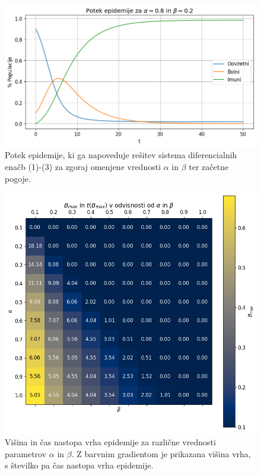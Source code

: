 \documentclass[slovene,11pt,a4paper]{article}
\begin{document}
\begin{figure}[h!]
\centering
\includegraphics[width=13.5cm]{zacetni1.png}
\caption{Potek epidemije, ki ga napoveduje rešitev sistema diferencialnih enačb (1)-(3) za zgoraj omenjene vrednosti $\alpha$ in $\beta$ ter začetne pogoje.}
\end{figure}

\begin{figure}[h!]
\centering
\includegraphics[width=13.5cm]{zacetni2.png}
\caption{Višina in čas nastopa vrha epidemije za različne vrednosti parametrov $\alpha$ in $\beta$. Z barvnim gradientom je prikazana višina vrha, s številko pa čas nastopa vrha epidemije.}
\end{figure}
\end{document}
